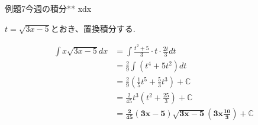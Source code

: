 \documentclass[main]{subfiles}
\begin{document}

\begin{newmondai}{例題}{7}{今週の積分}{**}
    \int xdx
\end{newmondai}


\solutionhead
\hfill
$t=\sqrt{3x-5}$とおき、置換積分する.
\hfill\

\begin{align*}
    \int x\sqrt{3x-5}dx
        &= \int\frac{t^2+5}{3}\cdot t\cdot \frac{2t}{3}dt \\
        &= \frac{2}{9}\int\left(t^4+5t^2\right)dt \\
        &= \frac{2}{9}\left(\frac{1}{5}t^5+\frac{5}{3}t^3\right)+\mathbb{C} \\
        &= \frac{2}{45}t^3\left(t^2+\frac{25}{3}\right)+\mathbb{C} \\
        &= \boldsymbol{\frac{2}{45}\left(3x-5\right)\sqrt{3x-5}\left(3x\frac{10}{3}\right)+\mathbb{C}}
\end{align*}
\end{document}
